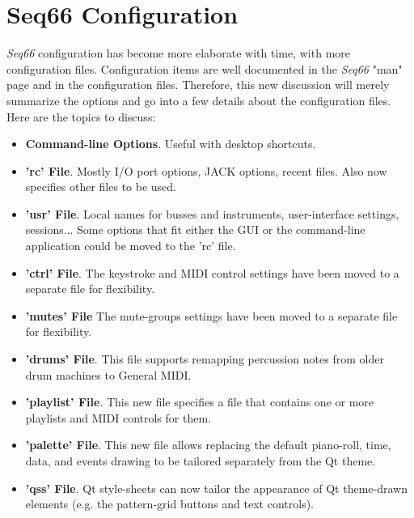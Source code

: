 %
%
%

\section{Seq66 Configuration}
\label{sec:configuration}

   \textsl{Seq66} configuration has become more elaborate with time, with more
   configuration files.
   Configuration items are well documented in the
   \textsl{Seq66} "man" page and in the configuration files.
   Therefore, this new discussion will merely summarize the options and
   go into a few details about the configuration files.
   Here are the topics to discuss:

   \begin{itemize}
      \item \textbf{Command-line Options}. Useful with desktop shortcuts.
      \item \textbf{'rc' File}. Mostly I/O port options, JACK options, recent
         files.  Also now specifies other files to be used.
      \item \textbf{'usr' File}. Local names for busses and instruments,
         user-interface settings, sessions... Some options that fit either the
         GUI or the command-line application could be moved to the 'rc' file.
      \item \textbf{'ctrl' File}. The keystroke and MIDI control settings have
         been moved to a separate file for flexibility.
      \item \textbf{'mutes' File} The mute-groups settings have
         been moved to a separate file for flexibility.
      \item \textbf{'drums' File}.  This file supports remapping percussion
         notes from older drum machines to General MIDI.
      \item \textbf{'playlist' File}. This new file specifies a file that
         contains one or more playlists and MIDI controls for them.
      \item \textbf{'palette' File}. This new file allows replacing the default
         piano-roll, time, data, and events drawing to be tailored separately
         from the Qt theme.
      \item \textbf{'qss' File}.  Qt style-sheets can now tailor the appearance
         of Qt theme-drawn elements
         (e.g. the pattern-grid buttons and text controls).
   \end{itemize}

